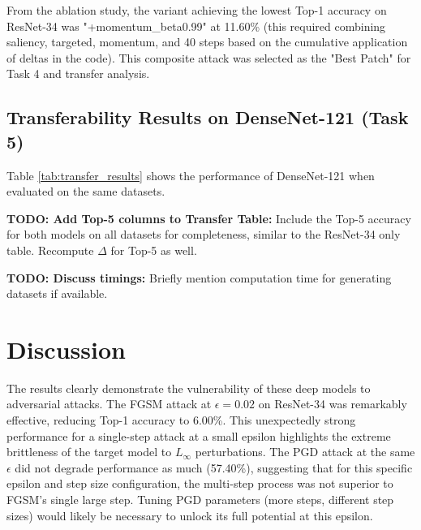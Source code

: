\documentclass[letterpaper]{article}
\begin{document}
From the ablation study, the variant achieving the lowest Top-1 accuracy on ResNet-34 was "+momentum\_beta0.99" at 11.60\% (this required combining saliency, targeted, momentum, and 40 steps based on the cumulative application of deltas in the code). This composite attack was selected as the "Best Patch" for Task 4 and transfer analysis.

\subsection{Transferability Results on DenseNet-121 (Task 5)}
Table \ref{tab:transfer_results} shows the performance of DenseNet-121 when evaluated on the same datasets.

\begin{table}[h!]
\centering
\caption{Model Accuracy on Adversarial Datasets (Crafted on ResNet-34)}
\label{tab:transfer_results}
\end{table}
\textbf{TODO: Add Top-5 columns to Transfer Table:} Include the Top-5 accuracy for both models on all datasets for completeness, similar to the ResNet-34 only table. Recompute $\Delta$ for Top-5 as well.

\textbf{TODO: Discuss timings:} Briefly mention computation time for generating datasets if available.

\section{Discussion}
The results clearly demonstrate the vulnerability of these deep models to adversarial attacks. The FGSM attack at $\epsilon=0.02$ on ResNet-34 was remarkably effective, reducing Top-1 accuracy to 6.00\%. This unexpectedly strong performance for a single-step attack at a small epsilon highlights the extreme brittleness of the target model to $L_\infty$ perturbations. The PGD attack at the same $\epsilon$ did not degrade performance as much (57.40\%), suggesting that for this specific epsilon and step size configuration, the multi-step process was not superior to FGSM's single large step. Tuning PGD parameters (more steps, different step sizes) would likely be necessary to unlock its full potential at this epsilon.
\end{document}
